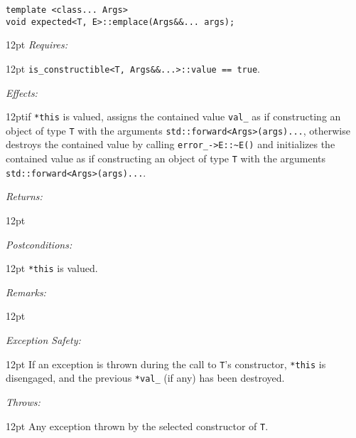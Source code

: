 \documentclass[a4paper,10pt]{article}
\newcommand{\cpp}[1]{\lstinline{#1}}
\newcommand{\wordingItem}[1]{\noindent\textit{#1:}}
\newenvironment{wordingTextItem}[1]{\wordingItem{#1}\vspace{7pt}\noindent\begin{adjustwidth}{12pt}{}}{\vspace{7pt}\end{adjustwidth}}
\newenvironment{wordingPara}{\begin{adjustwidth}{12pt}{}}{\end{adjustwidth}}
\begin{document}
\begin{lstlisting}[xleftmargin=0pt]
template <class... Args>
void expected<T, E>::emplace(Args&&... args); 
\end{lstlisting}
\begin{wordingPara}
\begin{wordingTextItem}{Requires}
\cpp{is_constructible<T, Args&&...>::value == true}.
\end{wordingTextItem}
\begin{wordingTextItem}{Effects}if \cpp{*this} is valued, assigns the contained value \cpp{val_} as if constructing an object of type \cpp{T} with the arguments \cpp{std::forward<Args>(args)...}, otherwise \\
destroys the contained value by calling \cpp{error_->E::~E()} and  initializes the contained value as if constructing an object of type \cpp{T} with the arguments \cpp{std::forward<Args>(args)...}.
\end{wordingTextItem}
\begin{wordingTextItem}{Returns}
\end{wordingTextItem}
\begin{wordingTextItem}{Postconditions}
\cpp{*this} is valued.
\end{wordingTextItem}
\begin{wordingTextItem}{Remarks}
\end{wordingTextItem}
\begin{wordingTextItem}{Exception Safety}
If an exception is thrown during the call to \cpp{T}'s constructor, \cpp{*this} is disengaged, and the previous \cpp{*val_} (if any) has been destroyed.
\end{wordingTextItem}
\begin{wordingTextItem}{Throws}
Any exception thrown by the selected constructor of \cpp{T}.
\end{wordingTextItem}
\end{wordingPara}
\end{document}
